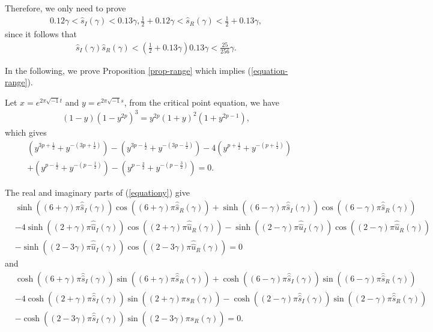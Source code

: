 \documentclass[12pt]{amsart}
\begin{document}
Therefore, we only need to prove
\begin{align} \label{equation-range}
   0.12\gamma
<\widehat{s}_{I}(\gamma)<0.13\gamma,\frac{1}{2}+0.12\gamma
<\widehat{s}_{R}(\gamma)<\frac{1}{2}+0.13\gamma, 
\end{align}
since it follows that
\begin{align}
\widehat{s}_{I}(\gamma)\widehat{s}_{R}(\gamma)<(\frac
{1}{2}+0.13\gamma)0.13\gamma<\frac{25}{256}\gamma. 
\end{align}
 
In the following, we prove Proposition \ref{prop-range} which implies (\ref{equation-range}).

Let $x=e^{2\pi\sqrt{-1}t}$ and $y=e^{2\pi\sqrt{-1}s}$, from the critical point equation, we have 
\begin{align}
  (1-y)(1-y^{2p})^{3}=y^{2p}(1+y)^{2}(1+y^{2p-1}),   
\end{align}
which gives
\begin{align} \label{equationy}
    &\left(  y^{3p+\frac{1}{2}}+y^{-(3p+\frac{1}{2})}\right)  -\left(
y^{3p-\frac{1}{2}}+y^{-(3p-\frac{1}{2})}\right)  -4\left(  y^{p+\frac{1}{2}
}+y^{-(p+\frac{1}{2})}\right) \\\nonumber
&+\left(  y^{p-\frac{1}{2}}+y^{-(p-\frac{1}{2}
)}\right)  -\left(  y^{p-\frac{3}{2}}+y^{-(p-\frac{3}{2})}\right)=0.
\end{align}

The real and imaginary parts of (\ref{equationy}) give
\begin{align} \label{equation-realpart}
&\sinh((6+\gamma)\pi\widehat{\widehat{s}}_{I}(\gamma))\cos
((6+\gamma)\pi\widehat{\widehat{s}}_{R}(\gamma))+\sinh((6-\gamma)\pi
\widehat{\widehat{s}}_{I}(\gamma))\cos((6-\gamma)\pi\widehat{\widehat{s}}%
_{R}(\gamma))\\\nonumber
&-4\sinh((2+\gamma)\pi\widehat{\widehat{u}}_{I}(\gamma))\cos((2+\gamma
)\pi\widehat{\widehat{u}}_{R}(\gamma))-\sinh((2-\gamma)\pi\widehat{\widehat
{u}}_{I}(\gamma))\cos((2-\gamma)\pi\widehat{\widehat{u}}_{R}(\gamma))\\\nonumber
&-\sinh((2-3\gamma)\pi\widehat{\widehat{u}}_{I}(\gamma))\cos((2-3\gamma
)\pi\widehat{\widehat{u}}_{R}(\gamma))=0
\end{align}
and 
\begin{align} \label{equation-imaginary}
&\cosh((6+\gamma)\pi\widehat{\widehat{s}}_{I}(\gamma
))\sin((6+\gamma)\pi\widehat{\widehat{s}}_{R}(\gamma))+\cosh((6-\gamma
)\pi\widehat{\widehat{s}}_{I}(\gamma))\sin((6-\gamma)\pi\widehat{\widehat{s}%
}_{R}(\gamma))\\\nonumber 
&-4\cosh((2+\gamma)\pi\widehat{\widehat{s}}_{I}(\gamma))\sin((2+\gamma
)\pi\widehat{\widehat{s}}_{R}(\gamma))-\cosh((2-\gamma)\pi\widehat{\widehat
{s}}_{I}(\gamma))\sin((2-\gamma)\pi\widehat{\widehat{s}}_{R}(\gamma))\\\nonumber
&-\cosh((2-3\gamma)\pi\widehat{\widehat{s}}_{I}(\gamma))\sin((2-3\gamma
)\pi\widehat{\widehat{s}}_{R}(\gamma))=0.
\end{align}
\end{document}
